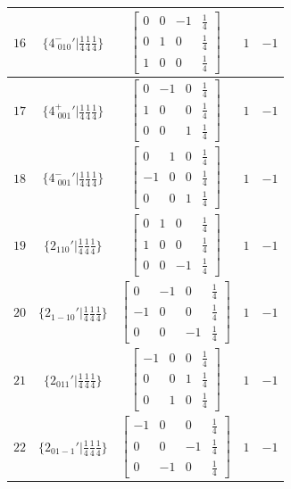 \documentclass[fleqn,8pt]{jsarticle}
\begin{document}
\begin{longtable}{ccccc}
$ 16 $ & $ \{4^{-}_{\,\,010}{}'|\frac{1}{4} \frac{1}{4} \frac{1}{4}\} $ & $ \begin{bmatrix} 0 & 0 & -1 & \frac{1}{4} \\ 0 & 1 & 0 & \frac{1}{4} \\ 1 & 0 & 0 & \frac{1}{4} \end{bmatrix} $ & $ 1 $ & $ -1 $ \\ \hline
$ 17 $ & $ \{4^{+}_{\,\,001}{}'|\frac{1}{4} \frac{1}{4} \frac{1}{4}\} $ & $ \begin{bmatrix} 0 & -1 & 0 & \frac{1}{4} \\ 1 & 0 & 0 & \frac{1}{4} \\ 0 & 0 & 1 & \frac{1}{4} \end{bmatrix} $ & $ 1 $ & $ -1 $ \\ \hline
$ 18 $ & $ \{4^{-}_{\,\,001}{}'|\frac{1}{4} \frac{1}{4} \frac{1}{4}\} $ & $ \begin{bmatrix} 0 & 1 & 0 & \frac{1}{4} \\ -1 & 0 & 0 & \frac{1}{4} \\ 0 & 0 & 1 & \frac{1}{4} \end{bmatrix} $ & $ 1 $ & $ -1 $ \\ \hline
$ 19 $ & $ \{2{}_{110}{}'|\frac{1}{4} \frac{1}{4} \frac{1}{4}\} $ & $ \begin{bmatrix} 0 & 1 & 0 & \frac{1}{4} \\ 1 & 0 & 0 & \frac{1}{4} \\ 0 & 0 & -1 & \frac{1}{4} \end{bmatrix} $ & $ 1 $ & $ -1 $ \\ \hline
$ 20 $ & $ \{2{}_{1-10}{}'|\frac{1}{4} \frac{1}{4} \frac{1}{4}\} $ & $ \begin{bmatrix} 0 & -1 & 0 & \frac{1}{4} \\ -1 & 0 & 0 & \frac{1}{4} \\ 0 & 0 & -1 & \frac{1}{4} \end{bmatrix} $ & $ 1 $ & $ -1 $ \\ \hline
$ 21 $ & $ \{2{}_{011}{}'|\frac{1}{4} \frac{1}{4} \frac{1}{4}\} $ & $ \begin{bmatrix} -1 & 0 & 0 & \frac{1}{4} \\ 0 & 0 & 1 & \frac{1}{4} \\ 0 & 1 & 0 & \frac{1}{4} \end{bmatrix} $ & $ 1 $ & $ -1 $ \\ \hline
$ 22 $ & $ \{2{}_{01-1}{}'|\frac{1}{4} \frac{1}{4} \frac{1}{4}\} $ & $ \begin{bmatrix} -1 & 0 & 0 & \frac{1}{4} \\ 0 & 0 & -1 & \frac{1}{4} \\ 0 & -1 & 0 & \frac{1}{4} \end{bmatrix} $ & $ 1 $ & $ -1 $ \\ \hline

\end{longtable}
\end{document}
